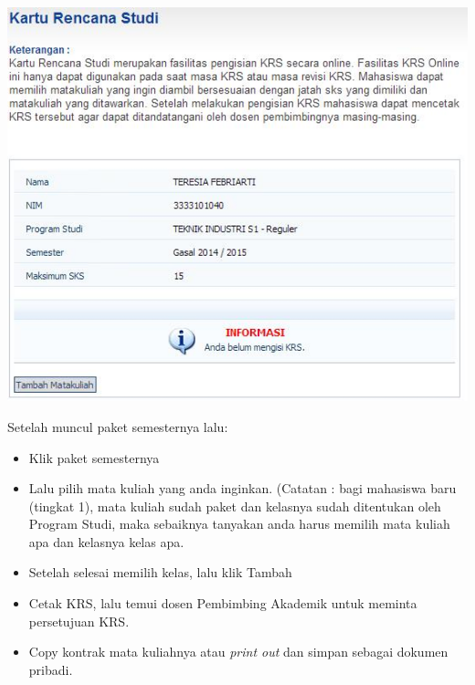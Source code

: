\documentclass[
]{book}
\begin{document}
\begin{enumerate}
  \includegraphics{static/3.6.jpg}

  Setelah muncul paket semesternya lalu:

  \begin{itemize}
  \item
    Klik paket semesternya
  \item
    Lalu pilih mata kuliah yang anda inginkan.
    (Catatan : bagi mahasiswa baru (tingkat 1), mata kuliah sudah paket dan kelasnya sudah ditentukan oleh Program Studi, maka sebaiknya tanyakan anda harus memilih mata kuliah apa dan kelasnya kelas apa.
  \item
    Setelah selesai memilih kelas, lalu klik Tambah
  \item
    Cetak KRS, lalu temui dosen Pembimbing Akademik untuk meminta persetujuan KRS.
  \item
    Copy kontrak mata kuliahnya atau \emph{print out} dan simpan sebagai dokumen pribadi.
  \end{itemize}


\end{enumerate}
\end{document}
